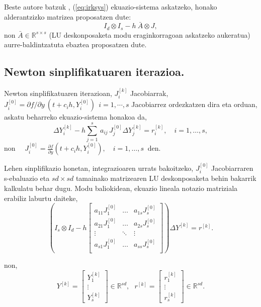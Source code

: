 Beste autore batzuk \cite{Brugnano2014,Jay2009}, (\ref{eq:irksys}) ekuazio-sistema askatzeko, honako alderantzizko matrizea proposatzen dute:
\begin{equation}
I_d \otimes I_s -h \ \bar{A} \otimes J,
\end{equation}
non $\bar{A} \in \mathbb{R}^{s \times s}$ (LU deskonposaketa modu eraginkorragoan askatzeko aukeratua) aurre-baldintzatuta ebaztea proposatzen dute. 


\subsection*{Newton sinplifikatuaren iterazioa.}

Newton sinplifikatuaren iterazioan, $J_i^{[k]}$ Jacobiarrak,  $J_i^{[0]}=\partial f / \partial y \ (t+c_ih, Y_i^{[0]}) \ \ i=1,\cdots,s$ Jacobiarrez ordezkatzen dira eta orduan, askatu beharreko ekuazio-sistema honakoa da,
\begin{equation}
\label{eq:irks}
\Delta Y_{i}^{[k]}  - h \sum_{j=1}^{s}\, a_{ij}\, J_j^{[0]} \Delta Y_{j}^{[k]} = r_i^{[k]}, \quad  i=1 ,\ldots, s,
\end{equation}
non $\quad  J_i^{[0]}=\frac{\partial f}{\partial y}(t + c_i h,Y_{i}^{[0]}), \quad  i=1,\ldots,s \ $ den.

Lehen sinplifikazio honetan, integrazioaren urrats bakoitzeko,  $J_i^{[0]}$ Jacobiarraren s-ebaluazio eta $sd \times sd$ tamainako matrizearen LU deskonposaketa behin bakarrik kalkulatu behar dugu. Modu baliokidean, ekuazio lineala notazio matriziala erabiliz laburtu daiteke,
\begin{equation*}
\label{eq:805}
\left (I_s \otimes I_d - h  
\begin{bmatrix}
a_{11}  J_1^{[0]} & \dots & a_{1s}  J_s^{[0]} \\
a_{21}  J_1^{[0]} & \dots & a_{2s}  J_s^{[0]} \\
\vdots            & \ddots & \vdots \\
a_{s1}  J_1^{[0]} & \dots & a_{ss}  J_s^{[0]} \\ 
\end{bmatrix} \right) \Delta Y^{[k]} =r^{[k]}.
\end{equation*}

non,
\begin{equation*}
\label{eq:806}
Y^{[k]}=\begin{bmatrix}
Y_1^{[k]} \\
\vdots \\
Y_s^{[k]}
\end{bmatrix} \in \mathbb{R}^{sd}, \ \ \
r^{[k]}=\begin{bmatrix}
r_1^{[k]} \\
\vdots \\
r_s^{[k]}
\end{bmatrix} \in \mathbb{R}^{sd}.
\end{equation*}

